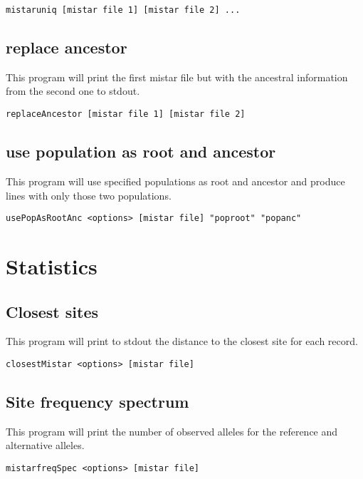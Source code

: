 \documentclass[a4paper]{article}
\begin{document}
\begin{verbatim}
mistaruniq [mistar file 1] [mistar file 2] ...
\end{verbatim}


\subsection{replace ancestor}

This program will print the first mistar file but with the ancestral information from the second one to stdout.

\begin{verbatim}
replaceAncestor [mistar file 1] [mistar file 2]
\end{verbatim}


\subsection{use population as root and ancestor}

This program will use specified populations as root and ancestor and produce lines with only those two populations.

\begin{verbatim}
usePopAsRootAnc <options> [mistar file] "poproot" "popanc"
\end{verbatim}



\section{Statistics}

\subsection{Closest sites}

This program will print to stdout the distance to the closest site for each record.

\begin{verbatim}
closestMistar <options> [mistar file]
\end{verbatim}

\subsection{Site frequency spectrum}

This program will print the number of observed alleles for the reference and alternative alleles.

\begin{verbatim}
mistarfreqSpec <options> [mistar file]
\end{verbatim}
\end{document}
